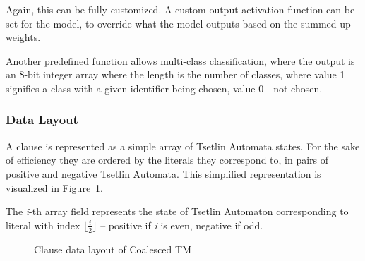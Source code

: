 Again, this can be fully customized. A custom output activation function can be set for the model, to override what the model outputs based on the summed up weights.

Another predefined function allows multi-class classification, where the output is an 8-bit integer array where the length is the number of classes, where value 1 signifies a class with a given identifier being chosen, value 0 - not chosen.

\subsubsection{Data Layout}
A clause is represented as a simple array of Tsetlin Automata states. For the sake of efficiency they are ordered by the literals they correspond to, in pairs of positive and negative Tsetlin Automata. This simplified representation is visualized in Figure~\ref{fig:dense-data-layout}.

The \textit{i}-th array field represents the state of Tsetlin Automaton corresponding to literal with index $\lfloor \frac{i}{2} \rfloor$ -- positive if \textit{i} is even, negative if odd.

\begin{figure}[!htbp]
\centering
{}
\caption{Clause data layout of Coalesced TM}
\label{fig:dense-data-layout}
\end{figure}

